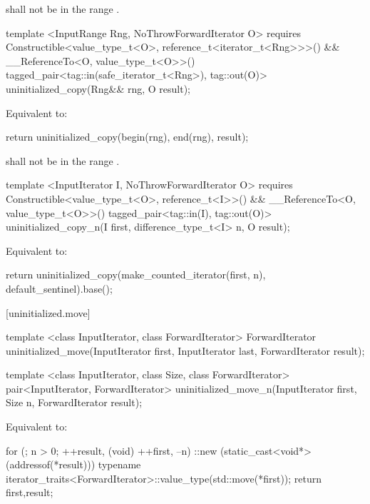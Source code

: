 {\color{addclr}
\requires {} shall not be in the range \tcode{[first, last)}.

\begin{codeblock}
template <InputRange Rng, NoThrowForwardIterator O>
  requires Constructible<value_type_t<O>, reference_t<iterator_t<Rng>>>() &&
           __ReferenceTo<O, value_type_t<O>>()
    tagged_pair<tag::in(safe_iterator_t<Rng>), tag::out(O)>
    uninitialized_copy(Rng&& rng, O result);
\end{codeblock}

\pnum
\effects Equivalent to:
\begin{codeblock}
        return uninitialized_copy(begin(rng), end(rng), result);
\end{codeblock}

\pnum
\requires {} shall not be in the range \tcode{[begin(rng), end(rng))}.

\begin{codeblock}
template <InputIterator I, NoThrowForwardIterator O>
  requires Constructible<value_type_t<O>, reference_t<I>>() &&
           __ReferenceTo<O, value_type_t<O>>()
    tagged_pair<tag::in(I), tag::out(O)>
    uninitialized_copy_n(I first, difference_type_t<I> n, O result);
\end{codeblock}

\pnum
\effects Equivalent to:
\begin{codeblock}
        return uninitialized_copy(make_counted_iterator(first, n),
                                  default_sentinel{}).base();
\end{codeblock}

\requires {}
} %

[uninitialized.move]{}
{\color{remclr}
\begin{codeblock}
template <class InputIterator, class ForwardIterator>
  ForwardIterator uninitialized_move(InputIterator first, InputIterator last,
                                     ForwardIterator result);
\end{codeblock}

\begin{codeblock}
template <class InputIterator, class Size, class ForwardIterator>
  pair<InputIterator, ForwardIterator>
    uninitialized_move_n(InputIterator first, Size n, ForwardIterator result);
\end{codeblock}

\setcounter{Paras}{2}
\pnum
\effects Equivalent to:
\begin{codeblock}
        for (; n > 0; ++result, (void) ++first, --n)
          ::new (static_cast<void*>(addressof(*result)))
            typename iterator_traits<ForwardIterator>::value_type(std::move(*first));
        return {first,result};
\end{codeblock}
} %

